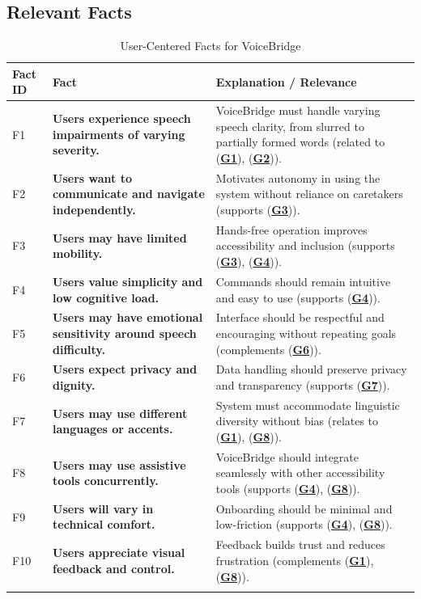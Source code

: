 \documentclass[11pt]{article}
\begin{document}
\subsection{Relevant Facts}


\begin{table}[H]
\centering
\setcounter{table}{3}  

\begin{tabularx}{\textwidth}{p{1cm}p{6cm}X}
\toprule {\textbf{Fact ID}} & {\textbf{Fact}} & {\textbf{Explanation / Relevance}}\\
\midrule
F1 & \textbf{Users experience speech impairments of varying severity.} & VoiceBridge must handle varying speech clarity, from slurred to partially formed words (related to (\textbf{\hyperref[tab:project-goals]{G1}}), (\textbf{\hyperref[tab:project-goals]{G2}})). \\ \hline
F2 & \textbf{Users want to communicate and navigate independently.} & Motivates autonomy in using the system without reliance on caretakers (supports (\textbf{\hyperref[tab:project-goals]{G3}})). \\ \hline
F3 & \textbf{Users may have limited mobility.} & Hands-free operation improves accessibility and inclusion (supports (\textbf{\hyperref[tab:project-goals]{G3}}), (\textbf{\hyperref[tab:project-goals]{G4}})). \\ \hline
F4 & \textbf{Users value simplicity and low cognitive load.} & Commands should remain intuitive and easy to use (supports (\textbf{\hyperref[tab:project-goals]{G4}})). \\ \hline
F5 & \textbf{Users may have emotional sensitivity around speech difficulty.} & Interface should be respectful and encouraging without repeating goals (complements (\textbf{\hyperref[tab:project-goals]{G6}})). \\ \hline
F6 & \textbf{Users expect privacy and dignity.} & Data handling should preserve privacy and transparency (supports (\textbf{\hyperref[tab:project-goals]{G7}})). \\ \hline
F7 & \textbf{Users may use different languages or accents.} & System must accommodate linguistic diversity without bias (relates to (\textbf{\hyperref[tab:project-goals]{G1}}), (\textbf{\hyperref[tab:project-goals]{G8}})). \\ \hline
F8 & \textbf{Users may use assistive tools concurrently.} & VoiceBridge should integrate seamlessly with other accessibility tools (supports (\textbf{\hyperref[tab:project-goals]{G4}}), (\textbf{\hyperref[tab:project-goals]{G8}})). \\ \hline
F9 & \textbf{Users will vary in technical comfort.} & Onboarding should be minimal and low-friction (supports (\textbf{\hyperref[tab:project-goals]{G4}}), (\textbf{\hyperref[tab:project-goals]{G8}})). \\ \hline
F10 & \textbf{Users appreciate visual feedback and control.} & Feedback builds trust and reduces frustration (complements (\textbf{\hyperref[tab:project-goals]{G1}}), (\textbf{\hyperref[tab:project-goals]{G8}})). \\
\bottomrule
\caption{User-Centered Facts for VoiceBridge}
\end{tabularx}
\end{table}
\end{document}
